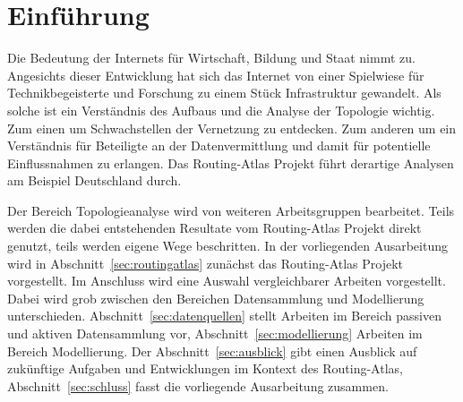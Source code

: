 \newpage

\section{Einführung}

Die Bedeutung der Internets für Wirtschaft, Bildung und Staat nimmt zu.
Angesichts dieser Entwicklung hat sich das Internet von einer Spielwiese für Technikbegeisterte und Forschung zu einem Stück Infrastruktur gewandelt.
Als solche ist ein Verständnis des Aufbaus und die Analyse der Topologie wichtig.
Zum einen um Schwachstellen der Vernetzung zu entdecken.
Zum anderen um ein Verständnis für Beteiligte an der Datenvermittlung und damit für potentielle Einflussnahmen zu erlangen.
Das Routing-Atlas Projekt führt derartige Analysen am Beispiel Deutschland durch.

Der Bereich Topologieanalyse wird von weiteren Arbeitsgruppen bearbeitet.
Teils werden die dabei entstehenden Resultate vom Routing-Atlas Projekt direkt genutzt, teils werden eigene Wege beschritten.
In der vorliegenden Ausarbeitung wird in Abschnitt~\ref{sec:routingatlas} zunächst das Routing-Atlas Projekt vorgestellt.
Im Anschluss wird eine Auswahl vergleichbarer Arbeiten vorgestellt.
Dabei wird grob zwischen den Bereichen Datensammlung und Modellierung unterschieden.
Abschnitt~\ref{sec:datenquellen} stellt Arbeiten im Bereich passiven und aktiven Datensammlung vor, Abschnitt~\ref{sec:modellierung} Arbeiten im Bereich Modellierung.
Der Abschnitt~\ref{sec:ausblick} gibt einen Ausblick auf zukünftige Aufgaben und Entwicklungen im Kontext des Routing-Atlas, Abschnitt~\ref{sec:schluss} fasst die vorliegende Ausarbeitung zusammen.
